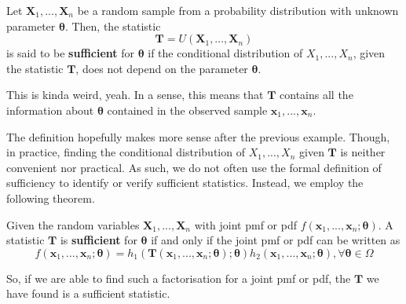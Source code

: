 \begin{definition}[Sufficient]\label{defn:sufficient}
    Let \(\bm{X}_1,...,\bm{X}_n\) be a random sample from a probability distribution with unknown parameter \(\bm{\theta}\). 
    Then, the statistic
    \[\bm{T} = U(\bm{X}_1,...,\bm{X}_n)\]
    is said to be \textbf{sufficient} for \(\bm{\theta}\) if the conditional distribution of \(X_1,...,X_n\), 
    given the statistic \(\bm{T}\), does not depend on the parameter \(\bm{\theta}\). 
\end{definition}

This is kinda weird, yeah. In a sense, this means that \(\bm{T}\) contains 
all the information about \(\bm{\theta}\) contained in the observed sample 
\(\bm{x}_1,...,\bm{x}_n\). 


    

\bigskip

The definition hopefully makes more sense after the previous example. 
Though, in practice, finding the conditional distribution 
of \(X_1,...,X_n\) given \(\bm{T}\) is neither convenient nor practical. 
As such, we do not often use the formal definition of sufficiency 
to identify or verify sufficient statistics. Instead, we employ 
the following theorem.


\begin{theorem}\label{thm: Factorisation Theorem}
    Given the random variables \(\bm{X}_1,...,\bm{X}_n\) with joint pmf or pdf \(f(\bm{x}_1,...,\bm{x}_n;\bm{\theta})\). 
    A statistic \(\bm{T}\) is \textbf{sufficient} for \(\bm{\theta}\) if and only if the joint pmf or pdf can be written as 
    \[f(\bm{x}_1,...,\bm{x}_n;\bm{\theta}) = h_1(\bm{T}(\bm{x}_1,...,\bm{x}_n;\bm{\theta});\bm{\theta})
    h_2(\bm{x}_1,...,\bm{x}_n;\bm{\theta}), \forall\bm{\theta}\in\Omega\]
\end{theorem}



So, if we are able to find such a factorisation for a joint pmf or pdf, 
the \(\bm{T}\) we have found is a sufficient statistic. 


